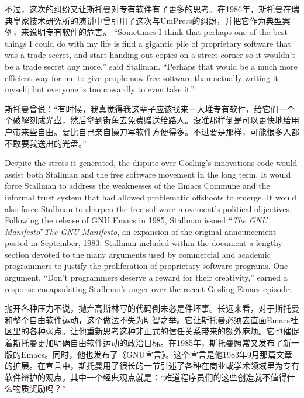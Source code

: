 \ifdefined\chs
不过，这次的纠纷又让斯托曼对专有软件有了更多的思考。在1986年，斯托曼在瑞典皇家技术研究所的演讲中曾引用了这次与UniPress的纠纷，并把它作为典型案例，来说明专有软件的危害。
\fi
\fi
\ifdefined\eng
``Sometimes I think that perhaps one of the best things I could do with my life is find a gigantic pile of proprietary software that was a trade secret, and start handing out copies on a street corner so it wouldn't be a trade secret any more,'' said Stallman. ``Perhaps that would be a much more efficient way for me to give people new free software than actually writing it myself; but everyone is too cowardly to even take it.''
\fi

\ifdefined\chs
斯托曼曾说：``有时候，我真觉得我这辈子应该找来一大堆专有软件，给它们一个个破解刻成光盘，然后拿到街角去免费赠送给路人。没准那样倒是可以更快地给用户带来些自由。要比自己亲自操刀写软件方便得多。不过要是那样，可能很多人都不敢要我送出的光盘。''
\fi

\ifdefined\eng
Despite the stress it generated, the dispute over Gosling's \ifdefined\vone innovations \fi\ifdefined\vtwo code \fi would assist both Stallman and the free software movement in the long term. It would force Stallman to address the weaknesses of the Emacs Commune and the informal trust system that had allowed problematic offshoots to emerge. It would also force Stallman to sharpen the free software movement's political objectives. Following the release of GNU Emacs in 1985, Stallman issued \ifdefined\vone ``\textit{The GNU Manifesto}''\fi\ifdefined\vtwo \textit{The GNU Manifesto}\fi, an expansion of the original announcement posted in September, 1983. Stallman included within the document a lengthy section devoted to the many arguments used by commercial and academic programmers to justify the proliferation of proprietary software programs. One argument, ``Don't programmers deserve a reward for their creativity,'' earned a response encapsulating Stallman's anger over the recent Gosling Emacs episode:
\fi

\ifdefined\chs
抛开各种压力不说，抛弃高斯林写的代码倒未必是件坏事。长远来看，对于斯托曼和整个自由软件运动，这个做法不失为明智之举。它让斯托曼必须去直面Emacs社区里的各种弱点。让他重新思考这种非正式的信任关系带来的额外麻烦。它也催促着斯托曼更加明确自由软件运动的政治目标。在1985年，斯托曼照常又发布了新一版的Emacs。同时，他也发布了《GNU宣言》。这个宣言是他1983年9月那篇文章的扩展。在宣言中，斯托曼用了很长的一节引述了各种在商业或学术领域里为专有软件辩护的观点。其中一个经典观点就是：``难道程序员们的这些创造就不值得什么物质奖励吗？''
\fi

